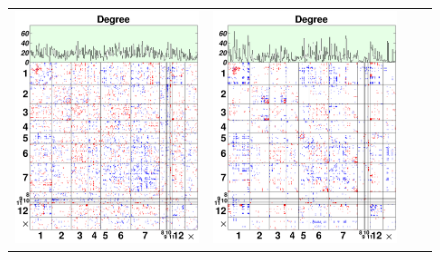 \begin{figure}[t!]
\begin{minipage}{\textwidth}
\begin{tabular}{cccc}
	\includegraphics[width=\imwidth]{exp_median_supp_gnet.pdf} &
	\includegraphics[width=\imwidth]{exp_median_supp_flas.pdf} &

\end{tabular}
\end{minipage}
\end{figure}

